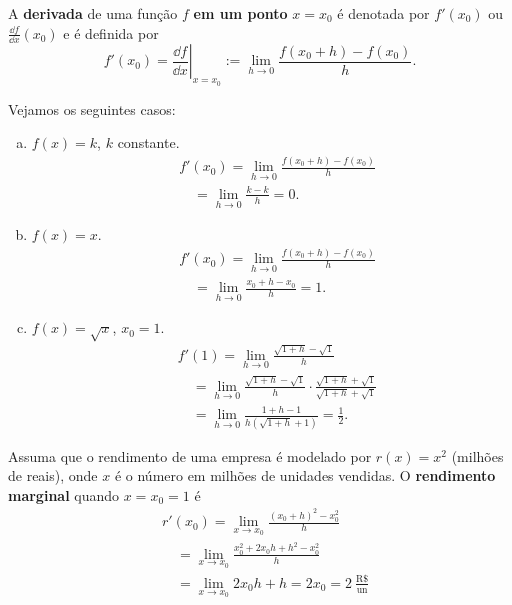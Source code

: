 A {\bf derivada} de uma função $f$ {\bf em um ponto} $x=x_0$ é denotada por $f'(x_0)$ ou $\displaystyle \frac{\dd f}{\dd x}(x_0)$ e é definida por
\begin{equation}
  f'(x_0) = \left.\frac{\dd f}{\dd x}\right|_{x=x_0} := \lim_{h\to 0} \frac{f(x_0+h)-f(x_0)}{h}.
\end{equation}

\begin{ex}
  Vejamos os seguintes casos:
  \begin{enumerate}[a)]
  \item $f(x) = k$, $k$ constante.
    \begin{align}
      & f'(x_0) = \lim_{h\to 0} \frac{f(x_0+h)-f(x_0)}{h}\\
      & \text{}\quad = \lim_{h\to 0} \frac{k-k}{h} = 0.
    \end{align}
  \item $f(x) = x$.
    \begin{align}
      & f'(x_0) = \lim_{h\to 0} \frac{f(x_0+h)-f(x_0)}{h} \\
      & \text{}\quad = \lim_{h\to 0} \frac{x_0+h-x_0}{h} = 1.
    \end{align}
  \item $f(x) = \sqrt{x}$, $x_0=1$.
    \begin{align}
      & f'(1) = \lim_{h\to 0} \frac{\sqrt{1+h}-\sqrt{1}}{h}\\
      & \text{}\quad = \lim_{h\to 0} \frac{\sqrt{1+h}-\sqrt{1}}{h} \cdot \frac{\sqrt{1+h}+\sqrt{1}}{\sqrt{1+h}+\sqrt{1}}\\
      & \text{}\quad = \lim_{h\to 0} \frac{1+h-1}{h(\sqrt{1+h}+1)} = \frac{1}{2}.
    \end{align}
  \end{enumerate}
\end{ex}

\begin{ex}
  Assuma que o rendimento de uma empresa é modelado por $r(x) = x^2$ (milhões de reais), onde $x$ é o número em milhões de unidades vendidas. O {\bf rendimento marginal} quando $x=x_0=1$ é
  \begin{align}
    & r'(x_0) = \lim_{x\to x_0}\frac{(x_0+h)^2-x_0^2}{h}\\
    & \text{}\quad = \lim_{x\to x_0}\frac{x_0^2+2x_0h+h^2-x_0^2}{h}\\
    & \text{}\quad = \lim_{x\to x_0} 2x_0h + h = 2x_0 = 2~\frac{\text{R\$}}{\text{un}}
  \end{align}
\end{ex}

